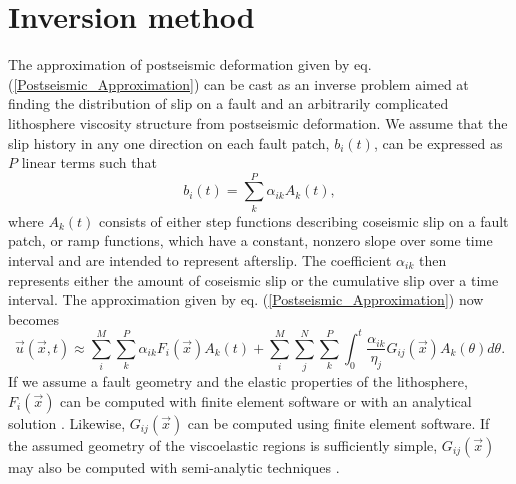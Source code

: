 \documentclass[extra,mreferee]{gji}
\begin{document}
\section{Inversion method}
The approximation of postseismic deformation given by eq.
(\ref{Postseismic_Approximation}) can be cast as an inverse problem
aimed at finding the distribution of slip on a fault and an
arbitrarily complicated lithosphere viscosity structure from
postseismic deformation. We assume that the slip history in any one
direction on each fault patch, $b_i(t)$, can be expressed as $P$ linear
terms such that
\begin{equation}
  b_i(t) = \sum_k^P \alpha_{ik}A_k(t),
\end{equation}
where $A_k(t)$ consists of either step functions describing coseismic
slip on a fault patch, or ramp functions, which have a constant, nonzero slope
over some time interval and are intended to represent afterslip.
The coefficient $\alpha_{ik}$ then represents either the amount of coseismic slip or
the cumulative slip over a time interval.  The approximation given by
eq. (\ref{Postseismic_Approximation}) now becomes
\begin{equation}\label{Postseismic_Approximation2}
  \vec{u}(\vec{x},t) \approx
  \sum_i^M\sum_k^P\alpha_{ik}F_i(\vec{x})A_k(t) +
  \sum_i^M\sum_j^N\sum_k^P\int_0^t\frac{\alpha_{ik}}{\eta_j}G_{ij}(\vec{x})A_k(\theta)d\theta.
\end{equation}
If we assume a fault geometry and the elastic properties of the
lithosphere, $F_i(\vec{x})$ can be computed with finite element
software or with an analytical solution
\citep[e.g.][]{O1992,M2007}. Likewise, $G_{ij}(\vec{x})$ can be
computed using finite element software.  If the assumed geometry of
the viscoelastic regions is sufficiently simple, $G_{ij}(\vec{x})$ may
also be computed with semi-analytic techniques
\citep[e.g.][]{P1997,FM2006,BF2010}.
\end{document}
